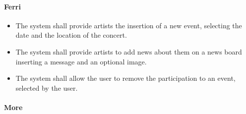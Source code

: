 \documentclass[11pt,a4paper]{article}
\begin{document}
\paragraph{Ferri}
\begin{itemize}
\item The system shall provide artists the insertion of a new event, selecting the date and the location of the concert.
\item The system shall provide artists to add news about them on a news board inserting a message and an optional image.
\item The system shall allow the user to remove the participation to an event, selected by the user.
\end{itemize}
\paragraph{More}
\end{document}
